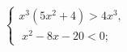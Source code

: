 \begin{ex}[type=ineq_system]
	\begin{condition}
		$\begin{cases} x^3(5x^2 + 4)>4x^3 ,\\
			\; x^2 - 8x - 20<0 ;
		\end{cases}$
	\end{condition}
\end{ex}